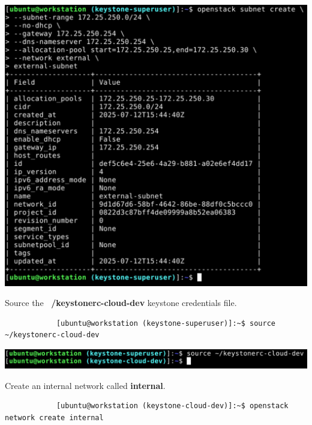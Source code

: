 \documentclass[letterpaper, 12pt]{article}
\begin{document}
\begin{enumerate}
\begin{labstep}
        \begin{center}
            \includegraphics[width=\linewidth]{images/part1/step24.png}
        \end{center}
    \end{labstep}

    \begin{labstep}
        Source the \textbf{~/keystonerc-cloud-dev} keystone credentials file.
        \begin{lstlisting}
            [ubuntu@workstation (keystone-superuser)]:~$ source ~/keystonerc-cloud-dev
        \end{lstlisting}

        \begin{center}
            \includegraphics[width=\linewidth]{images/part1/step25.png}
        \end{center}
    \end{labstep}

    \begin{labstep}
        Create an internal network called \textbf{internal}.
        \begin{lstlisting}
            [ubuntu@workstation (keystone-cloud-dev)]:~$ openstack network create internal
        \end{lstlisting}


\end{labstep}
\end{enumerate}
\end{document}
